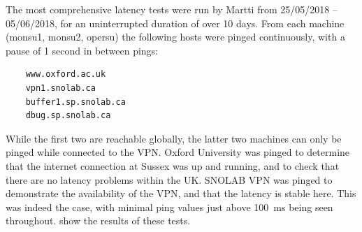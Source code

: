 \documentclass[a4paper,10pt]{article}
\begin{document}
% 

The most comprehensive latency tests were run by Martti from 25/05/2018 -- 05/06/2018, for an uninterrupted duration of over 10 days. From each machine (monsu1, monsu2, opersu) the following hosts were pinged continuously, with a pause of 1 second in between pings:
\begin{Verbatim}
	www.oxford.ac.uk
	vpn1.snolab.ca
	buffer1.sp.snolab.ca
	dbug.sp.snolab.ca
\end{Verbatim}
While the first two are reachable globally, the latter two machines can only be pinged while connected to the VPN.
Oxford University was pinged to determine that the internet connection at Sussex was up and running, and to check that there are no latency problems within the UK.
SNOLAB VPN was pinged to demonstrate the availability of the VPN, and that the latency is stable here. This was indeed the case, with minimal ping values just above 100~ms being seen throughout.
 show the results of these tests.
\end{document}
